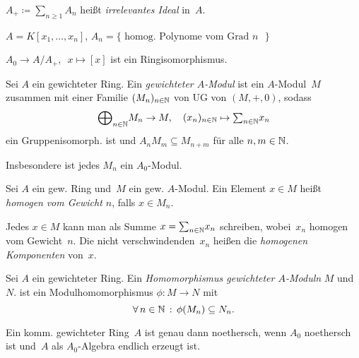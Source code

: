 \documentclass{cheat-sheet}
\begin{document}
\begin{defn}
  $A_+ \coloneqq {\sum}_{n \geq 1} A_n$ heißt \emph{irrelevantes Ideal} in~$A$.
\end{defn}

\begin{bsp}
  $A = K[x_1, \ldots, x_n]$, $A_n = \{ \text{ homog. Polynome vom Grad $n$ } \}$
\end{bsp}

\begin{prop}
  $A_0 \to A / A_+, \enspace x \mapsto [x]$ \quad
  ist ein Ringisomorphismus.
\end{prop}

\begin{defn}
  Sei $A$ ein gewichteter Ring.
  Ein \emph{gewichteter $A$-Modul} ist ein $A$-Modul~$M$ zusammen mit einer Familie $(M_n)_{n \in \mathbb{N}}$ von UG von $(M, +, 0)$, sodass
  \[
    {\bigoplus}_{n \in \N} M_n \to M, \quad
    (x_n)_{n \in \N} \mapsto {\sum}_{n \in \N} x_n
  \]
  ein Gruppenisomorph. ist und $A_n M_m \subseteq M_{n+m}$ für alle $n, m \in \mathbb{N}$.
\end{defn}

\begin{bem}
  Insbesondere ist jedes $M_n$ ein $A_0$-Modul.
\end{bem}

\begin{sprechweise}
  Sei $A$ ein gew. Ring und~$M$ ein gew. $A$-Modul.
  Ein Element $x \in M$ heißt \emph{homogen} \textit{vom Gewicht $n$}, falls $x \in M_n$.
\end{sprechweise}

\begin{bem}
  Jedes $x \in M$ kann man als Summe $x = {\sum}_{n \in \N} x_n$ schreiben, wobei~$x_n$ homogen vom Gewicht~$n$.
  Die nicht verschwindenden~$x_n$ heißen die \textit{homogenen Komponenten} von~$x$.
\end{bem}

\begin{defn}
  Sei $A$ ein gewichteter Ring.
  Ein \textit{Homomorphismus gewichteter $A$-Moduln} $M$ und~$N$. ist ein Modulhomomorphismus $\phi : M \to N$ mit
  \[
    \forall \, {n \in \mathbb{N}} \,:\, \phi(M_n) \subseteq N_n.
  \]
\end{defn}


\begin{prop}
  Ein komm. gewichteter Ring~$A$ ist genau dann noethersch, wenn $A_0$ noethersch ist und~$A$ als $A_0$-Algebra endlich erzeugt ist.
\end{prop}
\end{document}
